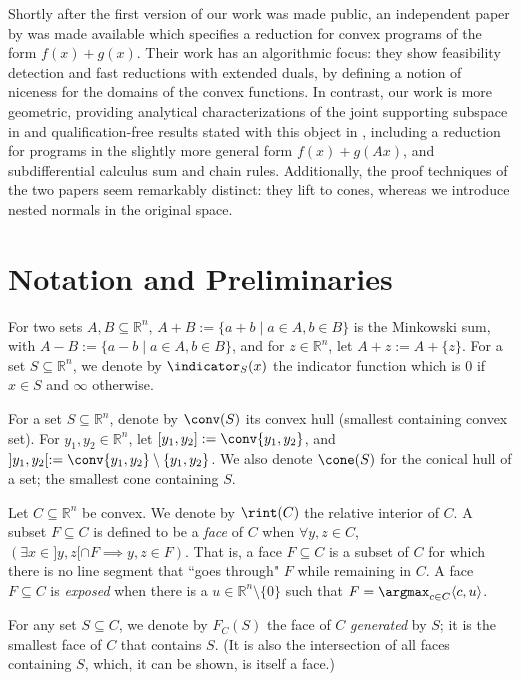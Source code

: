 \documentclass{article}
\theoremstyle{plain}
\theoremstyle{definition}
\theoremstyle{remark}
\begin{document}
Shortly after the first version of our work was made public, an independent paper by \textcite{linFacialReductionNice2025} was made available which specifies a reduction for convex programs of the form $f(x) + g(x)$. Their work has an algorithmic focus: they show feasibility detection and fast reductions with extended duals, by defining a notion of niceness for the domains of the convex functions. In contrast, our work is more geometric, providing analytical characterizations of the joint supporting subspace in  and qualification-free results stated with this object in , including a reduction for programs in the slightly more general form $f(x) + g(Ax)$, and subdifferential calculus sum and chain rules. Additionally, the proof techniques of the two papers seem remarkably distinct: they lift to cones, whereas we introduce nested normals in the original space.
\section{Notation and Preliminaries}
\label{loc:body.notation_and_preliminaries}
For two sets $A, B \subseteq \mathbb{R}^n$, $A+B := \{a+b \mid a \in A, b \in B\}$ is the Minkowski sum, with $A-B := \{a-b \mid a \in A, b \in B\}$,
and for $z \in \mathbb{R}^n$, let $A+z := A + \{z\}$.
For a set $S \subseteq \mathbb{R}^n$, we denote
by $\indicator_S(x)$ the indicator function which is
$0$ if $x \in S$ and $\infty$ otherwise.

For a set $S \subseteq \mathbb{R}^n$, denote by $\conv(S)$ its convex hull (smallest containing convex set). For $y_1, y_2 \in \mathbb{R}^n$, let $[y_1, y_2] := \conv \{y_1, y_2\}$, and $]y_1, y_2[ := \conv \{y_1, y_2\} \setminus \{y_1, y_2\}$.
We also denote $\cone(S)$ for the conical hull of a set; the smallest cone
containing $S$.

Let $C \subseteq \mathbb{R}^n$ be convex. We denote by $\rint(C)$ the relative interior of $C$. A subset $F \subseteq C$ is defined to be a \emph{face} of $C$ when $\forall y, z\in C$, $(\exists x \in ]y, z[ \cap F \implies y, z \in F)$.
That is, a face $F \subseteq C$ is a subset of $C$ for which there is no line segment that ``goes through" $F$ while remaining in $C$. 
A face $F \subseteq C$ is \emph{exposed} when there is a $u \in \mathbb{R}^n \setminus \{0\}$ such that $F = \argmax_{c \in C} \langle c, u\rangle$.

For any set $S \subseteq C$, we denote by $F_C(S)$ the face of $C$ \emph{generated} by $S$;
it is the smallest face of $C$ that contains $S$. (It is also the intersection
of all faces containing $S$, which, it can be shown, is itself a face.)
\end{document}
